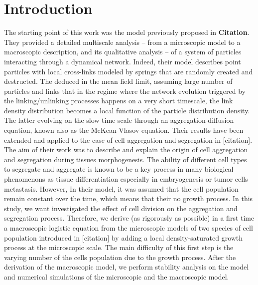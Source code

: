 \section*{Introduction}
The starting point of this work was the model previously proposed in \textbf{Citation}. They provided a detailed multiscale analysis -- from a microscopic model to a macroscopic description, and its qualitative analysis -- of a system of particles interacting through a dynamical network. Indeed, their model describes point particles with local cross-links modeled by springs that are randomly created and destructed. The deduced in the mean field limit, assuming large number of particles and links that in the regime where the network evolution triggered by the linking/unlinking processes happens on a very short timescale, the link density distribution becomes a local function of the particle distribution density. The latter evolving on the slow time scale through an aggregation-diffusion equation, known also as the McKean-Vlasov equation. Their results have been extended and applied to the case of cell aggregation and segregation in [citation]. The aim of their work was to describe and explain the origin of cell aggregation and segregation during tissues morphogenesis. The ability of different cell types to segregate and aggregate is known to be a key process in many biological phenomenons as tissue differentiation especially in embryogenesis or tumor cells metastasis. 
	However, In their model, it was assumed that the cell population remain constant over the time, which means that their no growth process. In this study, we want investigated the effect of cell division on the aggregation and segregation process. Therefore, we derive (as rigorously as possible) in a first time a macroscopic logistic equation from the microscopic models of two species of cell population introduced in [citation] by adding a local density-saturated growth process at the microscopic scale. The main difficulty of this first step is the varying number of the cells population due to the growth process. After the derivation of the macroscopic model, we perform stability analysis on the model and numerical simulations of the microscopic and the macroscopic model.